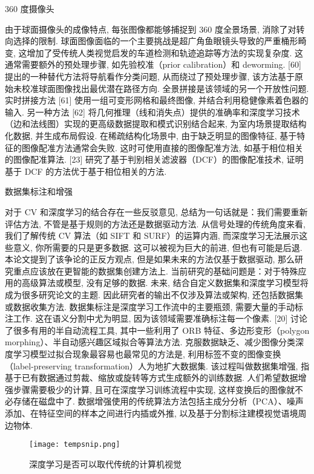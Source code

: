 360 度摄像头

由于球面摄像头的成像特点, 每张图像都能够捕捉到 360 度全景场景, 消除了对转向选择的限制. 球面图像面临的一个主要挑战是超广角鱼眼镜头导致的严重桶形畸变, 这增加了受传统人类视觉启发的车道检测和轨迹追踪等方法的实现复杂度. 这通常需要额外的预处理步骤, 如先验校准（prior calibration）和 deworming. [60] 提出的一种替代方法将导航看作分类问题, 从而绕过了预处理步骤, 该方法基于原始未校准球面图像找出最优潜在路径方向.
全景拼接是该领域的另一个开放性问题. 实时拼接方法 [61] 使用一组可变形网格和最终图像, 并结合利用稳健像素着色器的输入. 另一种方法 [62] 将几何推理（线和消失点）提供的准确率和深度学习技术（边和法线图）实现的更高级数据提取和模式识别结合起来, 为室内场景提取结构化数据, 并生成布局假设. 在稀疏结构化场景中, 由于缺乏明显的图像特征, 基于特征的图像配准方法通常会失败. 这时可使用直接的图像配准方法, 如基于相位相关的图像配准算法. [23] 研究了基于判别相关滤波器（DCF）的图像配准技术, 证明基于 DCF 的方法优于基于相位相关的方法.

数据集标注和增强

对于 CV 和深度学习的结合存在一些反驳意见, 总结为一句话就是：我们需要重新评估方法, 不管是基于规则的方法还是数据驱动方法. 从信号处理的传统角度来看, 我们了解传统 CV 算法（如 SIFT 和 SURF）的运算内涵, 而深度学习无法展示这些意义, 你所需要的只是更多数据. 这可以被视为巨大的前进, 但也有可能是后退. 本论文提到了该争论的正反方观点, 但是如果未来的方法仅基于数据驱动, 那么研究重点应该放在更智能的数据集创建方法上.
当前研究的基础问题是：对于特殊应用的高级算法或模型, 没有足够的数据. 未来, 结合自定义数据集和深度学习模型将成为很多研究论文的主题. 因此研究者的输出不仅涉及算法或架构, 还包括数据集或数据收集方法. 数据集标注是深度学习工作流中的主要瓶颈, 需要大量的手动标注工作. 这在语义分割中尤为明显, 因为该领域需要准确标注每一个像素. [20] 讨论了很多有用的半自动流程工具, 其中一些利用了 ORB 特征、多边形变形（polygon morphing）、半自动感兴趣区域拟合等算法方法.
克服数据缺乏、减少图像分类深度学习模型过拟合现象最容易也最常见的方法是, 利用标签不变的图像变换（label-preserving transformation）人为地扩大数据集. 该过程叫做数据集增强, 指基于已有数据通过剪裁、缩放或旋转等方式生成额外的训练数据. 人们希望数据增强步骤需要极少的计算, 且可在深度学习训练流程中实现, 这样变换后的图像就不必存储在磁盘中了. 数据增强使用的传统算法方法包括主成分分析（PCA）、噪声添加、在特征空间的样本之间进行内插或外推, 以及基于分割标注建模视觉语境周边物体.

\begin{figure}[H]
\centering
\texttt{[image: tempsnip.png]}
\caption{深度学习是否可以取代传统的计算机视觉}
\label{tempsnip}
\end{figure}

